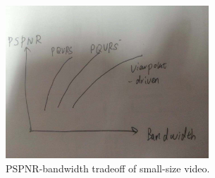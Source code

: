       \begin{figure}
  \centering
  \includegraphics[width=3in]{images/performance_type.jpeg}
  \caption{PSPNR-bandwidth tradeoff of small-size video.}
  \label{rating_res}
  \end{figure}
  